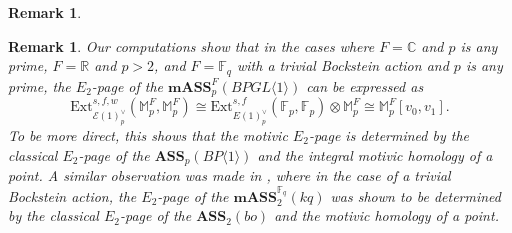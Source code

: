 \documentclass{amsart}
\newtheorem{remark}[theorem]{Remark}
\theoremstyle{plain}
\numberwithin{theorem}{section}
\numberwithin{equation}{section}
\numberwithin{figure}{section}
\newcommand{\0}{\langle 0 \rangle }
\begin{document}
\begin{remark}
\end{remark}

\begin{remark}
\label{remark:ExtE(1)fromClassical}
    \rm Our computations show that in the cases where $F=\mathbb{C}$ and $p$ is any prime, $F=\mathbb{R}$ and $p>2$, and $F=\mathbb{F}_q$ with a trivial Bockstein action and $p$ is any prime, the $E_2$-page of the $\textbf{mASS}^F_p(BPGL \langle 1 \rangle)$ can be expressed as
    \[\text{Ext}_{\mathcal{E}(1)^\vee_p}^{s,f,w}(\mathbb{M}^F_p, \mathbb{M}_p^F) \cong \text{Ext}_{E(1)^\vee_p}^{s,f}(\mathbb{F}_p, \mathbb{F}_p) \otimes \mathbb{M}_p^F \cong \mathbb{M}_p^F[v_0, v_1].\]
    To be more direct, this shows that the motivic $E_2$-page is determined by the classical $E_2$-page of the $\textbf{ASS}_p(BP \langle 1 \rangle)$ and the integral motivic homology of a point. A similar observation was made in \cite{finitekqcoop}, where in the case of a trivial Bockstein action, the $E_2$-page of the $\textbf{mASS}^{\mathbb{F}_q}_2(kq)$ was shown to be determined by the classical $E_2$-page of the $\textbf{ASS}_2(bo)$ and the motivic homology of a point.  
    
\end{remark}
\end{document}
